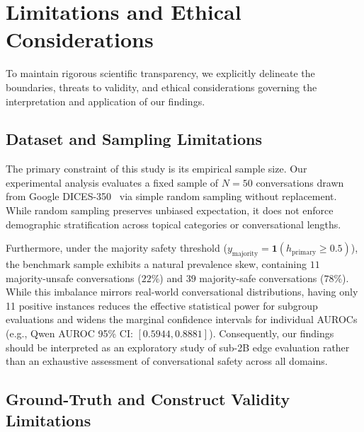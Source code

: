 \section{Limitations and Ethical Considerations}
\label{sec:limitations_ethics}

To maintain rigorous scientific transparency, we explicitly delineate the boundaries, threats to validity, and ethical considerations governing the interpretation and application of our findings.

\subsection{Dataset and Sampling Limitations}
\label{subsec:lim_dataset_sampling}

The primary constraint of this study is its empirical sample size. Our experimental analysis evaluates a fixed sample of $N=50$ conversations drawn from Google DICES-350~\cite{aroyo2023dices} via simple random sampling without replacement. While random sampling preserves unbiased expectation, it does not enforce demographic stratification across topical categories or conversational lengths. 

Furthermore, under the majority safety threshold ($y_{\text{majority}} = \mathbf{1}(h_{\text{primary}} \ge 0.5)$), the benchmark sample exhibits a natural prevalence skew, containing $11$ majority-unsafe conversations ($22\%$) and $39$ majority-safe conversations ($78\%$). While this imbalance mirrors real-world conversational distributions, having only 11 positive instances reduces the effective statistical power for subgroup evaluations and widens the marginal confidence intervals for individual AUROCs (e.g., Qwen AUROC 95\% CI: $[0.5944, 0.8881]$). Consequently, our findings should be interpreted as an exploratory study of sub-2B edge evaluation rather than an exhaustive assessment of conversational safety across all domains.

\subsection{Ground-Truth and Construct Validity Limitations}
\label{subsec:lim_ground_truth}

